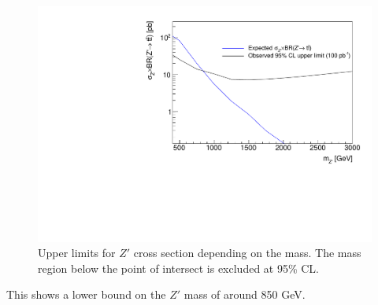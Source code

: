 \begin{figure}[H]
 \includegraphics[width=\textwidth]{../pics/limits.pdf}
 \caption{Upper limits for $Z'$ cross section depending on the mass. The mass region below the point of intersect is excluded at 95\% CL.}
 \label{pic:limits}
\end{figure}
This shows a lower bound on the $Z'$ mass of around 850 GeV. 



